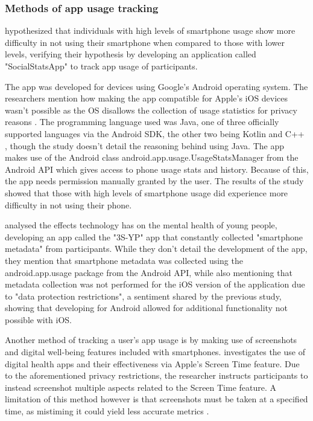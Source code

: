 \documentclass[12pt]{article}
\begin{document}
\subsubsection{Methods of app usage tracking}
\textcite{RefWorks:RefID:118-rosa2022problematic} hypothesized that individuals with high levels of 
smartphone usage show more difficulty in not using their smartphone when compared to those with lower levels, verifying their 
hypothesis by developing an application called "SocialStatsApp" to track app usage of participants.

The app was developed for devices using Google's Android operating system. The researchers
mention how making the app compatible for Apple's iOS devices wasn't possible as the OS
disallows the collection of usage statistics for privacy reasons \autocite{applesupport-ifanappasks}. 
The programming language used was Java, one of three officially supported languages via the Android SDK, 
the other two being Kotlin and C++ \autocite{androiddevelopment-appfundamentals}, though the study doesn't detail the 
reasoning behind using Java. The app makes use of the Android class 
\newline android.app.usage.UsageStatsManager from the 
Android API which gives access to phone usage stats and history. Because of this, the app needs permission 
manually granted by the user. The results of the study showed that those with high levels of smartphone usage 
did experience more difficulty in not using their phone. \newline

\textcite{RefWorks:RefID:116-bye2024cohort} analysed the effects technology has on 
the mental health of young people, developing an app called the "3S-YP" app 
that constantly collected "smartphone metadata" from participants. 
While they don't detail the development of the app, they mention that smartphone metadata was collected using 
the android.app.usage package from the Android API, while also mentioning that metadata collection was not 
performed for the iOS version of the application due to "data protection restrictions", a sentiment shared by the 
previous study, showing that developing for Android allowed for additional functionality not possible with iOS.\newline

Another method of tracking a user's app usage is by making use of screenshots
and digital well-being features included with smartphones. \textcite{RefWorks:RefID:124-ubochi2019apples} 
investigates the use of digital health apps and their effectiveness via Apple's Screen Time feature. 
Due to the aforementioned privacy restrictions, the researcher instructs participants to instead 
screenshot multiple aspects related to the Screen Time feature. A limitation of this method however is that 
screenshots must be taken at a specified time, as mistiming it could yield less accurate 
metrics \autocite{RefWorks:RefID:123-2024mobile}.
\end{document}
